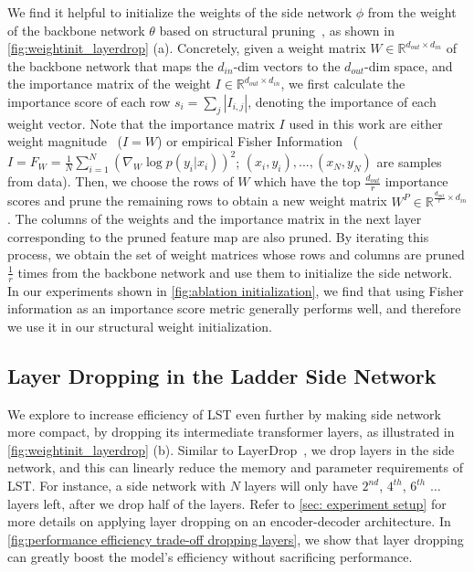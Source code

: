 We find it helpful to initialize the weights of the side network $\phi$ from the weight of the backbone network $\theta$ based on structural pruning~\cite{Li2017PruningFF}, as shown in \ref{fig:weightinit_layerdrop} (a). Concretely, given a weight matrix $W \in \mathbb{R}^{d_{out} \times d_{in}}$ of the backbone network that maps the $d_{in}$-dim vectors to the $d_{out}$-dim space, and the importance matrix of the weight $I \in \mathbb{R}^{d_{out} \times d_{in}}$, we first calculate the importance score of each row $s_i =\sum_{j} |I_{i,j}|$, denoting the importance of each weight vector. Note that the importance matrix $I$ used in this work are either weight magnitude~\cite{Li2017PruningFF} ($I = W$) or empirical Fisher Information~\cite{sung2021training} ($I = F_W = \frac{1}{N}\sum_{i=1}^{N}(\nabla_W \log p(y_i|x_i))^{2}$; $(x_i, y_i), ..., (x_N, y_N)$ are samples from data). Then, we choose the rows of $W$ which have the top $\frac{d_{out}}{r}$ importance scores and prune the remaining rows to obtain a new weight matrix $W^P \in \mathbb{R}^{\frac{d_{out}}{r} \times d_{in}}$. The columns of the weights and the importance matrix in the next layer corresponding to the pruned feature map are also pruned. By iterating this process, we obtain the set of weight matrices whose rows and columns are pruned $\frac{1}{r}$ times from the backbone network and use them to initialize the side network. In our experiments shown in \ref{fig:ablation initialization}, we find that using Fisher information as an importance score metric generally performs well, and therefore we use it in our structural weight initialization.

\subsection{Layer Dropping in the Ladder Side Network}
\label{sec: layer dropping}

We explore to increase efficiency of LST even further by making side network more compact, by dropping its intermediate transformer layers, as illustrated in \ref{fig:weightinit_layerdrop} (b). Similar to LayerDrop~\cite{Fan2020Reducing}, we drop layers in the side network, and this can linearly reduce the memory and parameter requirements of LST. For instance, a side network with $N$ layers will only have $2^{nd}$, $4^{th}$, $6^{th}$ $\ldots$ layers left, after we drop half of the layers. Refer to \ref{sec: experiment setup} for more details on applying layer dropping on an encoder-decoder architecture. In \ref{fig:performance efficiency trade-off dropping layers}, we show that layer dropping can greatly boost the model's efficiency without sacrificing performance. 

